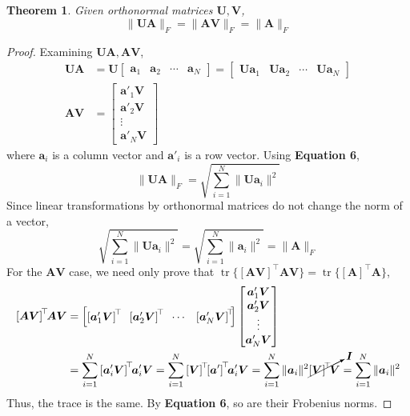 \documentclass[]{article}
\newtheorem{genthm}{Theorem}
\newcommand{\tpose}[1]{\left[#1\right]^{\! \top} \!\!}
\begin{document}
\subsection{}

\begin{genthm}
Given orthonormal matrices \(\bm{U}, \bm{V}\),
\begin{equation}
	\|\bm{UA}\|_F = \|\bm{AV}\|_F = \|\bm{A}\|_F
\end{equation}
\end{genthm}

\begin{proof}
Examining \(\bm{UA}, \bm{AV}\),
\begin{align}
	\bm{UA} &=
	\bm{U} \begin{bmatrix}
	\bm{a}_1 & \bm{a}_2 & \cdots & \bm{a}_N
	\end{bmatrix} =
	\begin{bmatrix}
	\bm{Ua}_1 & \bm{Ua}_2 & \cdots & \bm{Ua}_N
	\end{bmatrix} \\
	\bm{AV} &=
	\begin{bmatrix}
	\bm{a}'_1 \bm{V} \\
	\bm{a}'_2 \bm{V} \\
	\vdots \\
	\bm{a}'_N \bm{V}
	\end{bmatrix}
\end{align}
where \(\bm{a}_i\) is a column vector and \(\bm{a}'_i\) is a row vector.
Using \textbf{Equation 6},
\begin{equation}
	\|\bm{UA}\|_F = \sqrt{\sum_{i = 1}^N \|\bm{Ua}_i\|^2}
\end{equation}
Since linear transformations by orthonormal matrices do not change the norm of a vector,
\begin{equation}
	\sqrt{\sum_{i = 1}^N \|\bm{Ua}_i\|^2} = \sqrt{\sum_{i = 1}^N \|\bm{a}_i\|^2} = \|\bm{A}\|_F
\end{equation}
For the \(\bm{AV}\) case, we need only prove that \(\operatorname{tr}\{\tpose{\bm{AV}} \bm{AV}\} = \operatorname{tr}\{\tpose{\bm{A}} \bm{A}\}\),
\begin{align}
	\tpose{\bm{AV}} \bm{AV} &=
	\begin{bmatrix}
	\tpose{\bm{a}'_1 \bm{V}} & \tpose{\bm{a}'_2 \bm{V}} & \cdots & \tpose{\bm{a}'_N \bm{V}}
	\end{bmatrix}
	\begin{bmatrix}
	\bm{a}'_1 \bm{V} \\
	\bm{a}'_2 \bm{V} \\
	\vdots \\
	\bm{a}'_N \bm{V}
	\end{bmatrix} \\
	&= \sum_{i = 1}^N \tpose{\bm{a}'_i \bm{V}} \bm{a}'_i \bm{V} = \sum_{i = 1}^N \tpose{\bm{V}} \tpose{\bm{a}'} \bm{a}'_i \bm{V} = \sum_{i = 1}^N \|\bm{a}_i\|^2  \cancelto{\bm{I}}{\tpose{\bm{V}} \bm{V}} = \sum_{i = 1}^N \|\bm{a}_i\|^2
\end{align}
Thus, the trace is the same.
By \textbf{Equation 6}, so are their Frobenius norms.
\end{proof}
\end{document}
